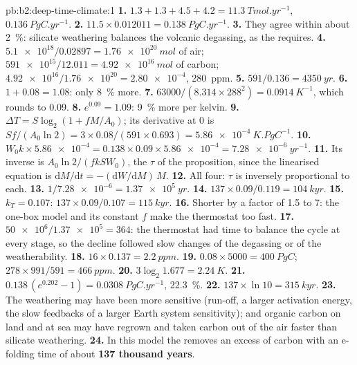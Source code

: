 \begin{solution}{pb:b2:deep-time-climate:1}
\textbf{1.} $1.3 + 1.3 + 4.5 + 4.2 = \qty{11.3}{Tmol.yr^{-1}}$, $\qty{0.136}{PgC.yr^{-1}}$.
\textbf{2.} $11.5\times0.012011 = \qty{0.138}{PgC.yr^{-1}}$.
\textbf{3.} They agree within about \qty{2}{\percent}: silicate weathering balances the volcanic
degassing, as the  requires.
\textbf{4.} $\num{5.1e18}/0.02897 = \qty{1.76e20}{mol}$ of air; $\num{591e15}/12.011 =
\qty{4.92e16}{mol}$ of carbon; $\num{4.92e16}/\num{1.76e20} = \num{2.80e-4}$, \qty{280}{ppm}.
\textbf{5.} $591/0.136 = \qty{4350}{yr}$.
\textbf{6.} $1 + 0.08 = 1.08$: only \qty{8}{\percent} more.
\textbf{7.} $63000/(8.314\times288^2) = \qty{0.0914}{K^{-1}}$, which rounds to 0.09.
\textbf{8.} $e^{0.09} = 1.09$: \qty{9}{\percent} more per kelvin.
\textbf{9.} $\Delta T = S\log_2(1 + fM/A_0)$; its derivative at 0 is $Sf/(A_0\ln2) =
3\times0.08/(591\times0.693) = \qty{5.86e-4}{K.PgC^{-1}}$.
\textbf{10.} $W_0k\times\num{5.86e-4} = 0.138\times0.09\times\num{5.86e-4} = \qty{7.28e-6}{yr^{-1}}$.
\textbf{11.} Its inverse is $A_0\ln2/(fkSW_0)$, the $\tau$ of the proposition, since the
linearised equation is $\mathrm dM/\mathrm dt = -(\mathrm dW/\mathrm dM)\,M$.
\textbf{12.} All four: $\tau$ is inversely proportional to each.
\textbf{13.} $1/\num{7.28e-6} = \qty{1.37e5}{yr}$.
\textbf{14.} $137\times0.09/0.119 = \qty{104}{kyr}$.
\textbf{15.} $k_T = 0.107$: $137\times0.09/0.107 = \qty{115}{kyr}$.
\textbf{16.} Shorter by a factor of 1.5 to 7: the one-box model and its constant $f$ make the
thermostat too fast.
\textbf{17.} $\num{50e6}/\num{1.37e5} = 364$: the thermostat had time to balance the cycle at every
stage, so the decline followed slow changes of the degassing or of the weatherability.
\textbf{18.} $16\times0.137 = \qty{2.2}{ppm}$.
\textbf{19.} $0.08\times5000 = \qty{400}{PgC}$; $278\times991/591 = \qty{466}{ppm}$.
\textbf{20.} $3\log_2 1.677 = \qty{2.24}{K}$.
\textbf{21.} $0.138\,(e^{0.202} - 1) = \qty{0.0308}{PgC.yr^{-1}}$, \qty{22.3}{\percent}.
\textbf{22.} $137\times\ln10 = \qty{315}{kyr}$.
\textbf{23.} The weathering may have been more sensitive (run-off, a larger activation energy, the
slow feedbacks of a larger Earth system sensitivity); and organic carbon on land and at sea may have
regrown and taken carbon out of the air faster than silicate weathering.
\textbf{24.} In this model the  removes an excess of carbon with an
e-folding time of about \textbf{\qty[text-series-to-math=true]{137}{} thousand years}.
\end{solution}
